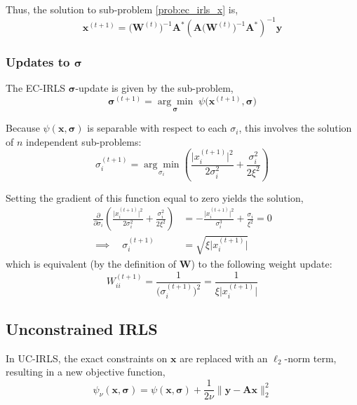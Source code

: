 \documentclass{article}
\newcommand{\m}[1]{\boldsymbol{#1}}
\begin{document}
Thus, the solution to sub-problem \eqref{prob:ec_irls_x} is,
\begin{equation}
\m{x}^{(t+1)} =
 \big(\m{W}^{(t)}\big)^{-1} \m{A}^*
 \left( \m{A} \big(\m{W}^{(t)}\big)^{-1} \m{A}^* \right)^{-1} \m{y}
\label{eq:ec_irls_x}
\end{equation}

\subsubsection{Updates to $\m{\sigma}$}
The EC-IRLS $\m{\sigma}$-update is given by the sub-problem,
\begin{equation}
\m{\sigma}^{(t+1)} =
 \underset{\m{\sigma}}{\arg\min} \;
 \psi\big( \m{x}^{(t+1)}, \m{\sigma} \big)
\label{prob:ec_irls_sigma}
\end{equation}

Because $\psi(\m{x}, \m{\sigma})$ is separable with respect to each
$\sigma_i$, this involves the solution of $n$ independent sub-problems:
\begin{equation}
\sigma_i^{(t+1)} =
 \underset{\sigma_i}{\arg\min} \left(
  \frac{\big| x_i^{(t+1)} \big|^2}{2 \sigma_i^2} +
  \frac{\sigma_i^2}{2 \xi^2}
 \right)
\label{prob:ec_irls_sigma_i}
\end{equation}

Setting the gradient of this function equal to zero yields the
solution,
\begin{equation}
\begin{aligned}
\frac{\partial}{\partial \sigma_i} \left(
  \frac{\big| x_i^{(t+1)} \big|^2}{2 \sigma_i^2} +
  \frac{\sigma_i^2}{2 \xi^2}
 \right) &=
-\frac{\big| x_i^{(t+1)} \big|^2}{\sigma_i^3} +
 \frac{\sigma_i}{\xi^2} = 0
\\ \implies \quad
\sigma_i^{(t+1)} &= \sqrt{\xi \big| x_i^{(t+1)} \big|}
\end{aligned}
\label{eq:ec_irls_sigma_i}
\end{equation}
which is equivalent (by the definition of $\m{W}$) to the following
weight update:
\begin{equation}
W_{ii}^{(t+1)} =
 \frac{1}{\big( \sigma_i^{(t+1)} \big)^2} =
 \frac{1}{\xi \big| x_i^{(t+1)} \big|}
\label{eq:ec_irls_w}
\end{equation}

\subsection{Unconstrained IRLS}
In UC-IRLS, the exact constraints on $\m{x}$ are replaced with an
$\ell_2$-norm term, resulting in a new objective function,
\begin{equation}
\psi_\nu(\m{x}, \m{\sigma}) =
 \psi(\m{x}, \m{\sigma}) + \frac{1}{2 \nu} \| \m{y} - \m{A} \m{x} \|_2^2
\label{eq:uc_irls_obj}
\end{equation}
\end{document}
